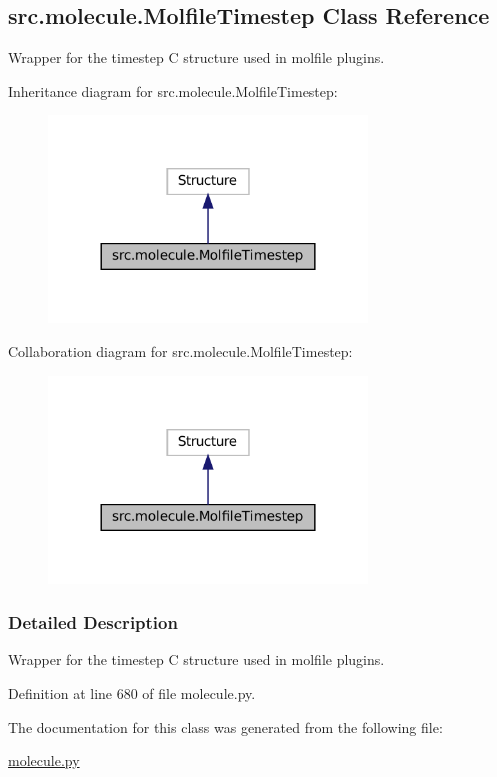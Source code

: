 \hypertarget{classsrc_1_1molecule_1_1MolfileTimestep}{}\subsection{src.\+molecule.\+Molfile\+Timestep Class Reference}
\label{classsrc_1_1molecule_1_1MolfileTimestep}


Wrapper for the timestep C structure used in molfile plugins.  




Inheritance diagram for src.\+molecule.\+Molfile\+Timestep\+:
\nopagebreak
\begin{figure}[H]
\begin{center}
\leavevmode
\includegraphics[width=240pt]{classsrc_1_1molecule_1_1MolfileTimestep__inherit__graph}
\end{center}
\end{figure}


Collaboration diagram for src.\+molecule.\+Molfile\+Timestep\+:
\nopagebreak
\begin{figure}[H]
\begin{center}
\leavevmode
\includegraphics[width=240pt]{classsrc_1_1molecule_1_1MolfileTimestep__coll__graph}
\end{center}
\end{figure}


\subsubsection{Detailed Description}
Wrapper for the timestep C structure used in molfile plugins. 



Definition at line 680 of file molecule.\+py.



The documentation for this class was generated from the following file\+:\begin{DoxyCompactItemize}
\item 
\hyperlink{molecule_8py}{molecule.\+py}\end{DoxyCompactItemize}
